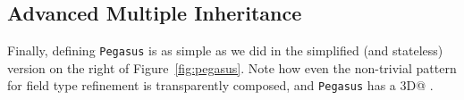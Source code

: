 \subsection{Advanced Multiple Inheritance}
Finally, defining \texttt{Pegasus} is as simple as we did in the simplified
(and stateless) version on the right of Figure~\ref{fig:pegasus}.
 Note how even the non-trivial pattern for field type refinement is
transparently composed, and \texttt{Pegasus} has a \Q@Point3D@
\Q@location@.%

